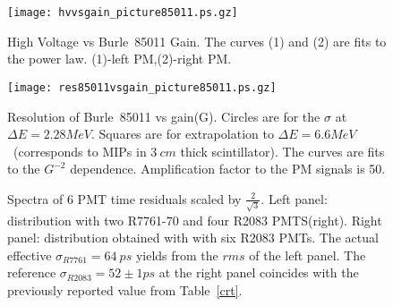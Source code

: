 \begin{figure}[htbp]%
\begin{center}
\texttt{[image: hvvsgain\_picture85011.ps.gz]}
\end{center}
\caption{High Voltage  vs Burle~85011 Gain.
The curves (1) and (2) are fits to the power law.
(1)-left  PM,(2)-right  PM.}
\label{hvvsgain85011}
\end{figure}
\clearpage

\begin{figure}[htbp]%
\begin{center}
\texttt{[image: res85011vsgain\_picture85011.ps.gz]}
\end{center}
\caption{Resolution  of Burle~85011  vs gain(G). 
Circles are for the $\sigma$ at ${\Delta}E=2.28MeV$.
Squares are for extrapolation to  ${\Delta}E=6.6MeV$~(corresponds to MIPs in $3~cm$ thick scintillator).
The curves are  fits to the $G^{-2}$ dependence.  
Amplification factor to the PM signals is 50.}
\label{sigmamip85011}
\end{figure}

\clearpage


\begin{figure}[ht]
\vspace*{0.2cm}
\epsfverbosetrue\epsfxsize=6.5cm\epsfysize=7cm
\hspace*{0.4cm}\epsfverbosetrue\epsfxsize=6.5cm\epsfysize=7cm
\vspace*{-0.3cm}
\caption{Spectra of 6 PMT time residuals scaled by $\frac{2}{\sqrt{3}}$.
 Left panel: distribution  with two R7761-70 and four R2083 PMTS(right).  
Right panel: distribution obtained with with  six R2083 PMTs.
The actual effective  $\sigma_{R7761}=64~ps$ yields from the $rms$ of the  left  panel.
The  reference  $\sigma_{R2083}=52\pm1ps$ at the right  panel  
coincides with the previously reported value from Table~\ref{crt}.
\label{finemesh01}}
\end{figure}
\clearpage

